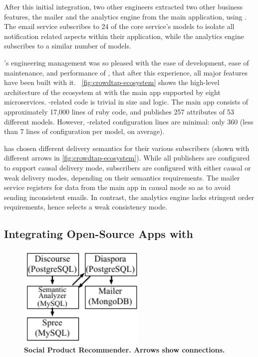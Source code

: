 After this initial integration, two other \crowdtap engineers extracted two other business features, the mailer and the analytics engine from the main application, using \synapse.
The email service subscribes to 24 of the core service's models to isolate all
notification related aspects within their application, while the analytics
engine subscribes to a similar number of models.

\crowdtap's engineering management was so pleased with the ease of development,
ease of maintenance, and performance of \synapse, that after this experience,
all major features have been built with it.
\F~\ref{fig:crowdtap-ecosystem} shows the high-level architecture of the
\synapse ecosystem at \crowdtap with the main app supported by eight
microservices.
\synapse-related code is trivial in size and logic.
The \crowdtap main app consists of approximately 17,000 lines of ruby code, and publishes 257 attributes of 53 different models.
However, \synapse-related configuration lines are minimal: only 360 (less
than 7 lines of configuration per model, on average).

\crowdtap has chosen different delivery semantics for their various subscribers
(shown with different arrows in \F\ref{fig:crowdtap-ecosystem}). While all
publishers are configured to support causal delivery mode, subscribers are
configured with either causal or weak delivery modes, depending on their
semantics requirements. The mailer service registers for data from
the main app in causal mode so as to avoid sending inconsistent emails.
In contrast, the analytics engine lacks stringent order
requirements, hence selects a weak consistency mode.

\subsection{Integrating Open-Source Apps with \synapse}
\label{sec:apps:social}

\begin{figure}[t]
\centering
   \includegraphics[width=2.4in]{figures/synapse/eco-social.pdf}
   \caption{\bf{Social Product Recommender.} Arrows show \synapse connections.}
   \label{fig:social-ecosystem}
\end{figure}

